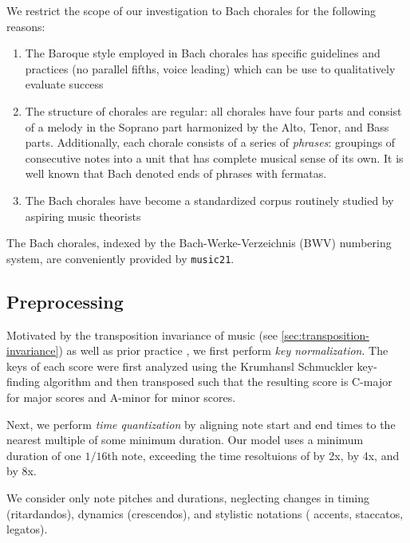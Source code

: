 We restrict the scope of our investigation to Bach chorales for the following reasons:
\begin{enumerate}
  \item The Baroque style employed in Bach chorales has specific guidelines and
    practices \citep{piston1978harmony} (\eg no parallel fifths, voice leading)
    which can be use to qualitatively evaluate success
  \item The structure of chorales are regular: all chorales have four parts and
    consist of a melody in the Soprano part harmonized by the Alto, Tenor, and
    Bass parts. Additionally, each chorale consists of a series of \emph{phrases}:
    groupings of consecutive notes into a unit that has complete musical sense
    of its own\citep{nattiez1990music}. It is well known that Bach
    denoted ends of phrases with fermatas.
  \item The Bach chorales have become a standardized corpus routinely studied
    by aspiring music theorists\citep{white2002guidelines}
\end{enumerate}
The Bach chorales, indexed by the Bach-Werke-Verzeichnis (BWV) numbering
system\citep{butt1999bach}, are conveniently provided by
\texttt{music21}\citep{Scott2015}.

\subsection{Preprocessing}

Motivated by the transposition invariance of music (see
\vref{sec:transposition-invariance}) as well as prior practice
\citep{mozer1994neural,Eck2002,franklin2004recurrent,franklin2005jazz}, we
first perform \emph{key normalization}. The keys of each score were first
analyzed using the Krumhansl Schmuckler key-finding algorithm
\citep{krumhansl2001cognitive} and then transposed such that the resulting
score is C-major for major scores and A-minor for minor scores.

Next, we perform \emph{time quantization} by aligning note start and end times
to the nearest multiple of some minimum duration. Our model uses a minimum
duration of one $1/16$th note, exceeding the time resoltuions of
\citep{Boulanger-Lewandowski2012} \citep{Eck2002} by 2x,
\citep{hild1991harmonet} by 4x, and \citep{bellgard1994harmonizing} by 8x.

We consider only note pitches and durations, neglecting changes in timing
(\eg ritardandos), dynamics (\eg crescendos), and stylistic notations (\eg
accents, staccatos, legatos).

